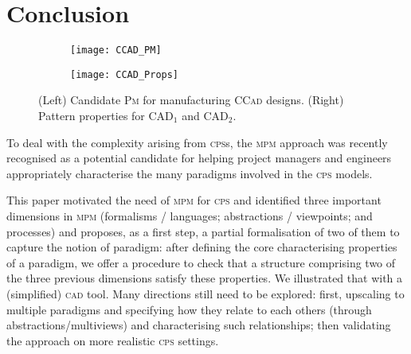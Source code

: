 \section{Conclusion}
\label{sec:Conclusion}

\begin{figure}[t]
\centering
\begin{subfigure}[t]{0.72\linewidth}
\centering
\texttt{[image: CCAD\_PM]}
\label{fig:CCAD-PM-Full}%
\end{subfigure}
\begin{subfigure}[t]{0.23\linewidth}
\centering
\texttt{[image: CCAD\_Props]}
\label{fig:PatternProperties}
\end{subfigure}
\vspace{-1em}
\caption{(Left) Candidate \textsc{Pm} for manufacturing \textsc{CCad} designs.
(Right) Pattern properties for $\mbox{CAD}_1$ and $\mbox{CAD}_2$.}
\end{figure}

To deal with the complexity arising from \textsc{cps}s, the \textsc{mpm} 
approach was recently recognised as a potential candidate for helping project 
managers and engineers appropriately characterise the many paradigms involved 
in the \textsc{cps} models. 

This paper motivated the need of \textsc{mpm} for \textsc{cps} and identified 
three important dimensions in \textsc{mpm} (formalisms / languages; 
abstractions / viewpoints; and processes) and proposes, as a first step, a 
partial formalisation of two of them to capture the notion of paradigm: after 
defining the core characterising properties of a paradigm, we offer a procedure 
to check that a structure comprising two of the three previous dimensions 
satisfy these properties. We illustrated that with a (simplified) \textsc{cad} 
tool. 
Many directions still need to be explored: first, upscaling to multiple 
paradigms and specifying how they relate to each others (through 
abstractions/multiviews) and characterising such relationships; then validating 
the approach on more realistic \textsc{cps} settings. 


